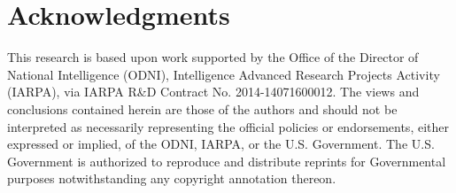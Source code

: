 \documentclass[10pt,twocolumn,letterpaper]{article}
\begin{document}
\section*{Acknowledgments}
This research is based upon work supported by the Office of the Director of National Intelligence (ODNI), Intelligence Advanced Research Projects
Activity (IARPA), via IARPA R\&D Contract No. 2014-14071600012. The views and conclusions contained herein are those of the authors and should
not be interpreted as necessarily representing the official policies or endorsements, either expressed or implied, of the ODNI, IARPA, or the U.S. Government. The U.S. Government is authorized to reproduce and distribute reprints for Governmental purposes notwithstanding any copyright annotation
thereon.
{\small


}
\end{document}
